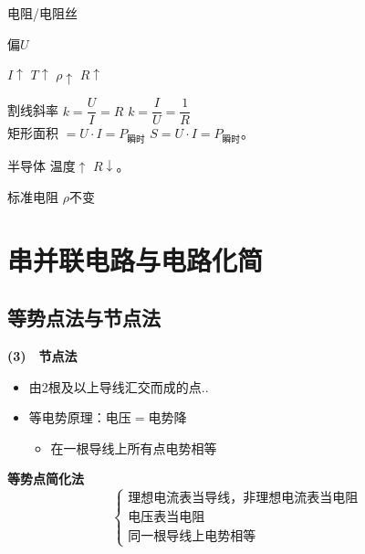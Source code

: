 
电阻/电阻丝

偏$U$

$I\uparrow$  $T\uparrow$ $\rho\uparrow$ $R\uparrow$

\noindent 割线斜率 $k=\dfrac{U}{I}=R$ \qquad\qquad $k=\dfrac{I}{U}=\dfrac{1}{R}$\\[4pt]
矩形面积 $=U\cdot I=P_{\text{瞬时}}$ \qquad\quad $S=U\cdot I=P_{\text{瞬时}}$。

半导体 \quad 温度$\uparrow$ $R\downarrow$。


标准电阻 \quad $\rho$不变




\section{串并联电路与电路化简}
\subsection{等势点法与节点法}
\noindent \textbf{(3)　节点法}
\begin{itemize}
\item 由2根及以上导线汇交而成的点..
\item 等电势原理：电压$=$电势降
\begin{itemize}
\item 在一根导线上所有点电势相等
\end{itemize}
\end{itemize}

\textbf{等势点简化法}
\[
\left\{\begin{array}{l}
\text{理想电流表当导线，非理想电流表当电阻}\\
\text{电压表当电阻}\\
\text{同一根导线上电势相等}
\end{array}\right.
\]

